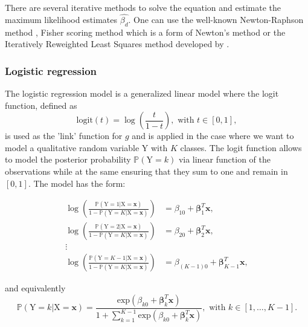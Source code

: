 \documentclass[]{book}
\begin{document}
There are several iterative methods to solve the equation and estimate
the maximum likelihood estimates \(\hat{\beta_d}\). One can use the
well-known Newton-Raphson method \citep{fletcher1987practical}, Fisher
scoring method \citep{longford1987fast} which is a form of Newton's method or
the Iteratively Reweighted Least Squares method developed by
\citep{nelder_generalized_1972}.

\hypertarget{logistic-regression}{%
\subsubsection*{Logistic regression}\label{logistic-regression}}

The logistic regression model \citep{cox1958regression} is a generalized
linear model where the logit function, defined as
\[\text{logit}(t) = \log \left( \frac{t}{1-t} \right), \text{ with } t \in [0,1],\]
is used as the 'link' function for \(g\) and is applied in the case where
we want to model a qualitative random variable \(\mathrm{Y}\) with \(K\) classes.
The logit function allows to model the posterior probability
\(\mathbb{P}(\mathrm{Y} = k)\) via linear function of the observations while at
the same ensuring that they sum to one and remain in \([0,1]\). The model
has the form:

\[\begin{aligned}
  \log \left( \frac{\mathbb{P}(\mathrm{Y} = 1 |\mathrm{X} = \boldsymbol{x})}{1 - \mathbb{P}(\mathrm{Y} = K |\mathrm{X} = \boldsymbol{x})} \right)  & = \beta_{10} + \boldsymbol{\beta}_1^T \boldsymbol{x},  \\
  \log \left( \frac{\mathbb{P}(\mathrm{Y} = 2 |\mathrm{X} = \boldsymbol{x})}{1 - \mathbb{P}(\mathrm{Y} = K |\mathrm{X} = \boldsymbol{x})} \right)  & = \beta_{20} + \boldsymbol{\beta}_2^T\boldsymbol{x},  \\
  \vdots  \\
  \log \left( \frac{\mathbb{P}(\mathrm{Y} = K-1 |\mathrm{X} = \boldsymbol{x})}{1 - \mathbb{P}(\mathrm{Y} = K |\mathrm{X} = \boldsymbol{x})} \right) & = \beta_{(K-1)0} + \boldsymbol{\beta}_{K-1}^T\boldsymbol{x} ,
 \label{eq=logit}\end{aligned}\]

and equivalently
\[\mathbb{P}(\mathrm{Y} = k |\mathrm{X} = \boldsymbol{x}) = \frac{\text{exp}(\beta_{k0} + \boldsymbol{\beta}_k^T\boldsymbol{x})}{1 + \sum_{k=1}^{K-1} \text{exp}(\beta_{k0} + \boldsymbol{\beta}_k^T\boldsymbol{x})}, \text{ with } k \in [1,\dots,K-1].
 \label{eq=logit2}\]
\end{document}
